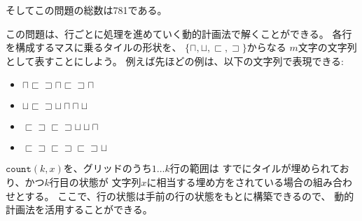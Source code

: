 \begin{comment}
and the total number of solutions is 781.

The problem can be solved using dynamic programming
by going through the grid row by row.
Each row in a solution can be represented as a
string that contains $m$ characters from the set
$\{\sqcap, \sqcup, \sqsubset, \sqsupset \}$.
For example, the above solution consists of four rows
that correspond to the following strings:
\end{comment}

そしてこの問題の総数は781である。

この問題は、行ごとに処理を進めていく動的計画法で解くことができる。
各行を構成するマスに乗るタイルの形状を、
$\{\sqcap, \sqcup, \sqsubset, \sqsupset \}$からなる
$m$文字の文字列として表すことにしよう。
例えば先ほどの例は、以下の文字列で表現できる:
\begin{itemize}
\item
$\sqcap \sqsubset \sqsupset \sqcap \sqsubset \sqsupset \sqcap$
\item
$\sqcup \sqsubset \sqsupset \sqcup \sqcap \sqcap \sqcup$
\item
$\sqsubset \sqsupset \sqsubset \sqsupset \sqcup \sqcup \sqcap$ 
\item
$\sqsubset \sqsupset \sqsubset \sqsupset \sqsubset \sqsupset \sqcup$
\end{itemize}

\begin{comment}
Let $\texttt{count}(k,x)$ denote the number of ways to
construct a solution for rows $1 \ldots k$
of the grid such that string $x$ corresponds to row $k$.
It is possible to use dynamic programming here,
because the state of a row is constrained
only by the state of the previous row.

A solution is valid if row $1$ does not contain
the character $\sqcup$,
row $n$ does not contain the character $\sqcap$,
and all consecutive rows are \emph{compatible}.
For example, the rows
$\sqcup \sqsubset \sqsupset \sqcup \sqcap \sqcap \sqcup$ and
$\sqsubset \sqsupset \sqsubset \sqsupset \sqcup \sqcup \sqcap$ 
are compatible, while the rows
$\sqcap \sqsubset \sqsupset \sqcap \sqsubset \sqsupset \sqcap$ and
$\sqsubset \sqsupset \sqsubset \sqsupset \sqsubset \sqsupset \sqcup$
are not compatible.
\end{comment}

$\texttt{count}(k,x)$を、グリッドのうち$1 \ldots k$行の範囲は
すでにタイルが埋められており、かつ$k$行目の状態が
文字列$x$に相当する埋め方をされている場合の組み合わせとする。
ここで、行の状態は手前の行の状態をもとに構築できるので、
動的計画法を活用することができる。

